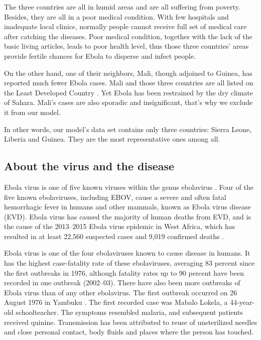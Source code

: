 \documentclass[11pt]{article}
\begin{document}
The three countries are all in humid areas and are all suffering from poverty. Besides, they are all in a poor medical condition. With few hospitals and inadequate local clinics, normally people cannot receive full set of medical care after catching the diseases. Poor medical condition, together with the lack of the basic living articles, leads to poor health level, thus those three countries' areas provide fertile chances for Ebola to disperse and infect people.

On the other hand, one of their neighbors, Mali, though adjoined to Guinea, has reported much fewer Ebola cases. Mali and those three countries are all listed on the Least Developed Country \cite{LeastDevelopedCountry}. Yet Ebola has been restrained by the dry climate of Sahara. Mali's cases are also sporadic and insignificant, that's why we exclude it from our model.

In other words, our model's data set contains only three countries: Sierra Leone, Liberia and Guinea. They are the most representative ones among all.

\subsection{About the virus and the disease}%

Ebola virus is one of five known viruses within the genus ebolavirus \cite{Ebolavirus}. Four of the five known ebolaviruses, including EBOV, cause a severe and often fatal hemorrhagic fever in humans and other mammals, known as Ebola virus disease (EVD). Ebola virus has caused the majority of human deaths from EVD, and is the cause of the 2013–2015 Ebola virus epidemic in West Africa, which has resulted in at least 22,560 suspected cases and 9,019 confirmed deaths \cite{NumOfCases}.

Ebola virus is one of the four ebolaviruses known to cause disease in humans. It has the highest case-fatality rate of these ebolaviruses, averaging 83 percent since the first outbreaks in 1976, although fatality rates up to 90 percent have been recorded in one outbreak (2002–03). There have also been more outbreaks of Ebola virus than of any other ebolavirus. The first outbreak occurred on 26 August 1976 in Yambuku \cite{FirstOutbreak}. The first recorded case was Mabalo Lokela, a 44‑year-old schoolteacher. The symptoms resembled malaria, and subsequent patients received quinine. Transmission has been attributed to reuse of unsterilized needles and close personal contact, body fluids and places where the person has touched.
\end{document}
